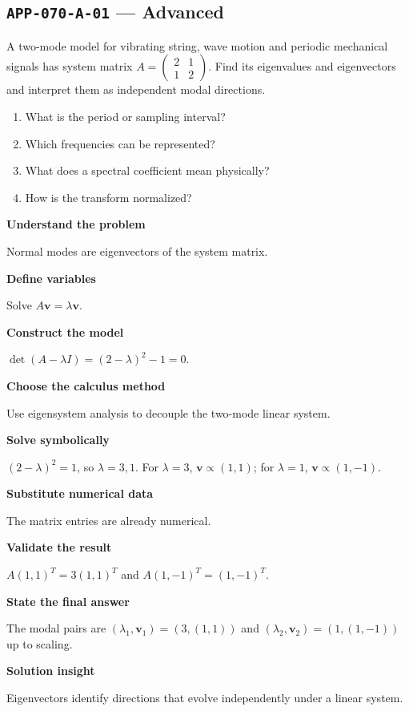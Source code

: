 \documentclass[11pt]{book}
\newcommand{\pid}[1]{\texttt{#1}}
\begin{document}
\subsection*{\pid{APP-070-A-01} — Advanced}
\begin{problembox}
A two-mode model for vibrating string, wave motion and periodic mechanical signals has system matrix $A=\begin{pmatrix}2&1\\1&2\end{pmatrix}$. Find its eigenvalues and eigenvectors and interpret them as independent modal directions.
\end{problembox}
\begin{promptbox}\begin{enumerate}
\item What is the period or sampling interval?
\item Which frequencies can be represented?
\item What does a spectral coefficient mean physically?
\item How is the transform normalized?
\end{enumerate}\end{promptbox}
\begin{solutionbox}
\textbf{Understand the problem}\par Normal modes are eigenvectors of the system matrix.\par\medskip
\textbf{Define variables}\par Solve $A\mathbf v=\lambda\mathbf v$.\par\medskip
\textbf{Construct the model}\par $\det(A-\lambda I)=(2-\lambda)^2-1=0$.\par\medskip
\textbf{Choose the calculus method}\par Use eigensystem analysis to decouple the two-mode linear system.\par\medskip
\textbf{Solve symbolically}\par $(2-\lambda)^2=1$, so $\lambda=3,1$. For $\lambda=3$, $\mathbf v\propto(1,1)$; for $\lambda=1$, $\mathbf v\propto(1,-1)$.\par\medskip
\textbf{Substitute numerical data}\par The matrix entries are already numerical.\par\medskip
\textbf{Validate the result}\par $A(1,1)^T=3(1,1)^T$ and $A(1,-1)^T=(1,-1)^T$.\par\medskip
\textbf{State the final answer}\par The modal pairs are $(\lambda_1,\mathbf v_1)=(3,(1,1))$ and $(\lambda_2,\mathbf v_2)=(1,(1,-1))$ up to scaling.\par\medskip
\textbf{Solution insight}\par Eigenvectors identify directions that evolve independently under a linear system.\par\medskip
\end{solutionbox}
\end{document}
